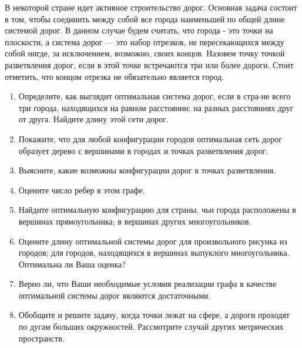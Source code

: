 В некоторой стране идет активное строительство дорог. Основная задача состоит в том, чтобы соединить между собой все города наименьшей по общей длине системой дорог.
В данном случае будем считать, что города - это точки на плоскости, а система дорог — это набор отрезков, не пересекающихся между собой нигде, за исключением, возможно, своих концов. Назовем точку точкой разветвления дорог, если в этой точке встречаются три или более дороги. Стоит отметить, что концом отрезка не обязательно является город.
\begin{enumerate}
\item Определите, как выглядит оптимальная система дорог, если в стра-\linebreak не всего три города, находящихся на равном расстоянии;  на разных расстояниях друг от друга. Найдите длину этой сети дорог.
\item Покажите, что для любой конфигурации городов оптимальная сеть дорог образует дерево с вершинами в городах и точках разветвления дорог.
\item Выясните, какие возможны конфигурации дорог в точках разветвления.
\item Оцените число ребер в этом графе.
\item Найдите оптимальную конфигурацию для страны, чьи города расположены в вершинах прямоугольника;  в вершинах других многоугольников.
\item Оцените длину оптимальной системы дорог для произвольного рисунка из городов;  для городов, находящихся в вершинах выпуклого многоугольника. Оптимальна ли Ваша оценка?
\item Верно ли, что Ваши необходимые условия  реализации графа в качестве оптимальной системы дорог являются достаточными.
\item Обобщите и решите задачу, когда точки лежат на сфере, а дороги проходят по дугам больших окружностей. Рассмотрите случай других метрических пространств.
\end{enumerate}



